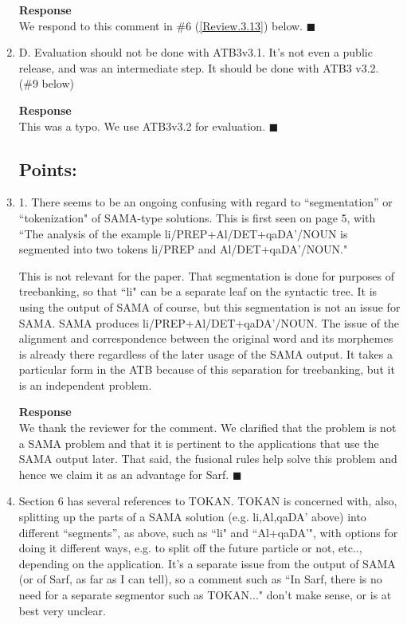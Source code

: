 \begin{enumerate}[leftmargin=0mm,label=\bfseries CommentR3.\arabic*]
\textbf{Response}\\
We respond to this comment in \#6 (\ref{Review.3.13}) below. 
$\blacksquare$

\item \label{Review.3.4}
D. Evaluation should not be done with ATB3v3.1.  It's not even a public release, and was an intermediate step. 
It should be done with ATB3 v3.2.  (\#9 below)

\textbf{Response}\\
This was a typo. We use ATB3v3.2 for evaluation. 
$\blacksquare$

\subsection*{Points:}
\item \label{Review.3.5}
1. There seems to be an ongoing confusing with regard to ``segmentation'' or ``tokenization" of SAMA-type solutions.
This is first seen on page 5, with  ``The analysis of the example  li/PREP+Al/DET+qaDA'/NOUN is segmented into two tokens li/PREP and Al/DET+qaDA'/NOUN."

This is not relevant for the paper.  That segmentation is done for  purposes of treebanking, so that ``li" can be a separate leaf on  the syntactic tree.  It is using the output of SAMA of course, but this segmentation is not an issue for SAMA.  SAMA produces li/PREP+Al/DET+qaDA'/NOUN.  The issue of the alignment and correspondence between the original word and its morphemes is already there regardless of the later usage of the SAMA output.  It takes a particular form in the ATB because of this separation for treebanking, but it is an independent problem.

\textbf{Response}\\
We thank the reviewer for the comment. We clarified that the problem is not a SAMA problem and that it is pertinent to the 
applications that use the SAMA output later. 
That said, the fusional rules help solve this problem and hence we claim it as an advantage for Sarf.
$\blacksquare$

\item \label{Review.3.6}
Section 6 has several references to TOKAN.  
TOKAN is concerned with, also, splitting up the parts of a SAMA solution (e.g. li,Al,qaDA' above) into different ``segments'', as above, such as ``li" and ``Al+qaDA'", with options for doing it different ways, e.g. to split off the future particle or not, etc.., depending on the application. It's a separate issue from the output of SAMA (or of Sarf, as far as I can tell), so a comment such as ``In Sarf, there is no need for a separate segmentor such as TOKAN..." don't make sense, or is at best very unclear.


\end{enumerate}
